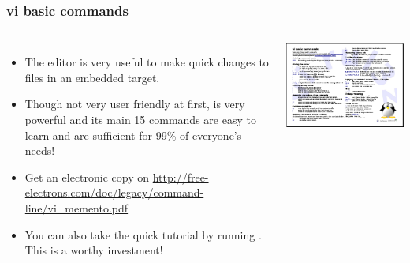 \begin{frame}
  \frametitle{vi basic commands}
  \begin{columns}
    \begin{itemize}
      \item The  editor is very useful to make quick
      changes to files in an embedded target.
      \item Though not very user friendly at first, 
      is very powerful and its main 15 commands are easy to
      learn and are sufficient for 99\% of everyone's needs!
      \item Get an electronic copy on
      \url{http://free-electrons.com/doc/legacy/command-line/vi_memento.pdf}
      \item You can also take the quick tutorial by running
      . This is a worthy investment!
    \end{itemize}
    \includegraphics[width=\textwidth]{slides/course-information/vi_memento.png}
  \end{columns}
\end{frame}

